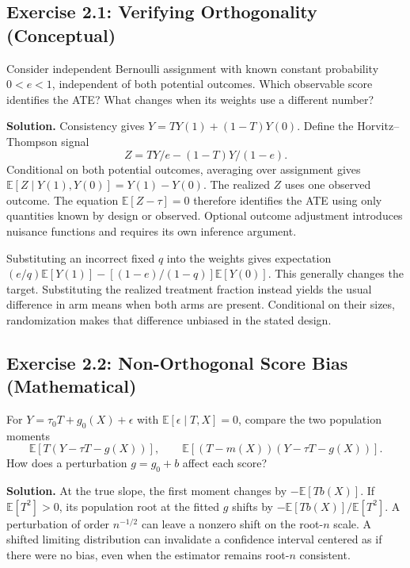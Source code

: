\subsection{Exercise 2.1: Verifying Orthogonality
(Conceptual)}\label{_exercise_2_1_verifying_orthogonality_conceptual}

Consider independent Bernoulli assignment with known constant probability \(0<e<1\), independent of both potential outcomes. Which observable score identifies the ATE? What changes when its weights use a different number?

\textbf{Solution.} Consistency gives \(Y=TY(1)+(1-T)Y(0)\). Define the Horvitz--Thompson signal
\[
Z=TY/e-(1-T)Y/(1-e).
\]
Conditional on both potential outcomes, averaging over assignment gives \(\mathbb E[Z\mid Y(1),Y(0)]=Y(1)-Y(0)\). The realized \(Z\) uses one observed outcome. The equation \(\mathbb E[Z-\tau]=0\) therefore identifies the ATE using only quantities known by design or observed. Optional outcome adjustment introduces nuisance functions and requires its own inference argument.

Substituting an incorrect fixed \(q\) into the weights gives expectation \((e/q)\mathbb E[Y(1)]-[(1-e)/(1-q)]\mathbb E[Y(0)]\). This generally changes the target. Substituting the realized treatment fraction instead yields the usual difference in arm means when both arms are present. Conditional on their sizes, randomization makes that difference unbiased in the stated design.

\subsection{Exercise 2.2: Non-Orthogonal Score Bias
(Mathematical)}\label{_exercise_2_2_non_orthogonal_score_bias_mathematical}

For \(Y=\tau_0T+g_0(X)+\epsilon\) with \(\mathbb E[\epsilon\mid T,X]=0\), compare the two population moments
\[
\mathbb E[T(Y-\tau T-g(X))],\qquad
\mathbb E[(T-m(X))(Y-\tau T-g(X))].
\]
How does a perturbation \(g=g_0+b\) affect each score?

\textbf{Solution.} At the true slope, the first moment changes by \(-\mathbb E[Tb(X)]\). If \(\mathbb E[T^2]>0\), its population root at the fitted \(g\) shifts by \(-\mathbb E[Tb(X)]/\mathbb E[T^2]\). A perturbation of order \(n^{-1/2}\) can leave a nonzero shift on the root-\(n\) scale. A shifted limiting distribution can invalidate a confidence interval centered as if there were no bias, even when the estimator remains root-\(n\) consistent.

